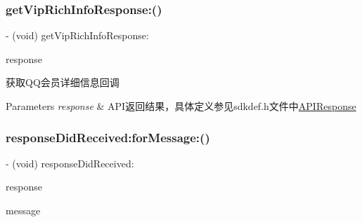 \subsubsection{\texorpdfstring{get\+Vip\+Rich\+Info\+Response\+:()}{getVipRichInfoResponse:()}\hspace{0.1cm}{\footnotesize\ttfamily [2/2]}}
{\footnotesize\ttfamily -\/ (void) get\+Vip\+Rich\+Info\+Response\+: \begin{DoxyParamCaption}\item[{(\mbox{\hyperlink{interface_a_p_i_response}{A\+P\+I\+Response}} $\ast$)}]{response }\end{DoxyParamCaption}\hspace{0.3cm}{\ttfamily [optional]}}

获取\+Q\+Q会员详细信息回调 
\begin{DoxyParams}{Parameters}
{\em response} & A\+P\+I返回结果，具体定义参见sdkdef.\+h文件中\mbox{\hyperlink{interface_a_p_i_response}{A\+P\+I\+Response}} \\
\hline
\end{DoxyParams}
\mbox{\label{protocol_tencent_session_delegate-p_aec2b0e15cdc45c30b0f67b708f97c44a}} 
\subsubsection{\texorpdfstring{response\+Did\+Received\+:for\+Message\+:()}{responseDidReceived:forMessage:()}\hspace{0.1cm}{\footnotesize\ttfamily [1/2]}}
{\footnotesize\ttfamily -\/ (void) response\+Did\+Received\+: \begin{DoxyParamCaption}\item[{(\mbox{\hyperlink{interface_a_p_i_response}{A\+P\+I\+Response}} $\ast$)}]{response }\item[{forMessage:(N\+S\+String $\ast$)}]{message }\end{DoxyParamCaption}\hspace{0.3cm}{\ttfamily [optional]}}

